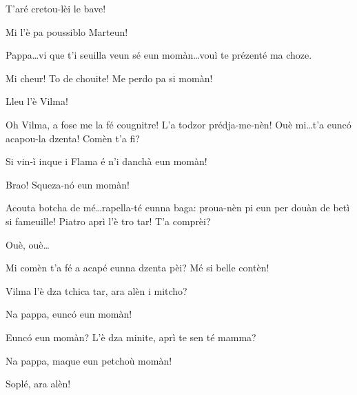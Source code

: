\begin{drama}
\Djouiyaoudouspeaks T'aré cretou-lèi le bave!

\Selmospeaks Mi l'è pa poussiblo Marteun!



\Giuliospeaks{} Pappa\ldots vi que t’i seuilla veun sé eun momàn\ldots vouì te prézenté ma choze.

\Selmospeaks{} Mi cheur! To de chouite! Me perdo pa si momàn!


\Giuliospeaks Lleu l'è Vilma!

\Selmospeaks{} Oh Vilma, a fose me la fé cougnitre! L'a todzor prédja-me-nèn! Ouè mi\ldots t'a eunc\'o acapou-la dzenta! Comèn t'a fi?

\Giuliospeaks{} Si vin-ì inque i Flama é n'i danchà eun momàn!

\Selmospeaks Brao!  Squeza-n\'o eun momàn!


\Selmospeaks{} Acouta botcha de mé\ldots rapella-té eunna baga: proua-nèn pi eun per douàn de betì si fameuille! Piatro aprì l'è tro tar! T'a comprèi?

\Giuliospeaks Ouè, ouè\ldots

\Selmospeaks{} Mi comèn t'a fé a acapé eunna dzenta pèi? Mé si belle contèn!


\Pinospeaks Vilma l’è dza tchica tar, ara alèn i mitcho?

\Vilmaspeaks Na pappa, eunc\'o eun momàn!

\Pinospeaks Eunc\'o eun momàn? L'è dza minite, aprì te sen té mamma?

\Vilmaspeaks Na pappa, maque eun petchoù momàn!

\Pinospeaks Soplé, ara alèn!



\end{drama}
